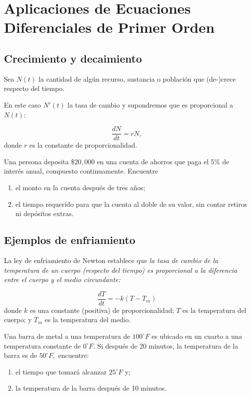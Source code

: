 

%
%


\section[Aplicaciones]{Aplicaciones de Ecuaciones Diferenciales de Primer Orden}

\subsection{Crecimiento y decaimiento}


	Sea $N(t)$ la cantidad de algún recurso, sustancia o población que (de-)crece respecto del tiempo.

	En este caso $N'(t)$ la tasa de cambio y supondremos que es proporcional a $N(t):$

	\[
		\label{bron:7.1}
		\dfrac{dN}{dt}=rN,
	\]
	donde $r$ es la constante de proporcionalidad.

	\begin{resuelto}
		Una persona deposita $\$20,000$ en una cuenta de ahorros que paga el 5\% de interés  anual, compuesto continuamente.
		Encuentre
		\begin{enumerate}
			\item el monto en la cuenta después de tres años;
			\item el tiempo requerido para que la cuenta al doble de su valor, sin contar retiros ni depósitos extras.
		\end{enumerate}

	\end{resuelto}



\subsection{Ejemplos de enfriamiento}


	La ley de enfriamiento de Newton establece que \emph{la tasa de cambio de la temperatura de un cuerpo (respecto del tiempo) es proporcional a la diferencia entre el cuerpo y el medio circundante:}

	\[
		\label{bron:7.2}
		\dfrac{dT}{dt}=-k\left( T-T_{m} \right)
	\]
	donde $k$ es una constante (positiva) de proporcionalidad; $T$ es la temperatura del cuerpo; y $T_{m}$ es la temperatura del medio.


%
  \begin{resuelto}
   Una barra de metal a una temperatura de $100^\circ F$ es ubicado en un cuarto a una temperatura constante de $0^\circ F.$ Si después de 20 minutos, la temperatura de la barra es de $50^\circ F,$ encuentre:
   \begin{enumerate}
    \item el tiempo que tomará alcanzar $25^\circ F$ y;
    \item la temperatura de la barra después de 10 minutos.
   \end{enumerate}

  \end{resuelto}




